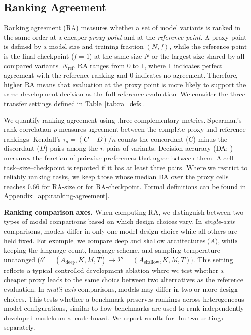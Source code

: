 




\subsection{Ranking Agreement}
\label{subsec:methodology-da}

Ranking agreement (RA) measures whether a set of model variants is ranked in the same order at a cheaper \emph{proxy point} and at the  \emph{reference point}. 
A proxy point is defined by a model size and training fraction $(N,f)$, while the reference point is the final checkpoint ($f=1$) at the same size $N$ or the largest size shared by all compared variants, $N_{\mathrm{ref}}$.
RA ranges from 0 to 1, where 1 indicates perfect agreement with the reference ranking and 0 indicates no agreement.
Therefore, higher RA means that evaluation at the proxy point is more likely to support the same development decision as the full reference evaluation.
We consider the three transfer settings defined in Table~\ref{tab:ra_defs}.

We quantify ranking agreement using three complementary metrics. Spearman's rank correlation $\rho$ measures agreement between the complete proxy and reference rankings.
Kendall's $\tau_a = (C-D)/n$ counts the concordant ($C$) minus the discordant ($D$) pairs among the $n$ pairs of variants.
Decision accuracy (DA; \citealp{heineman_signal_2025}) measures the fraction of pairwise preferences that agree between them.
A cell task--size--checkpoint is reported if it has at least three pairs.
Where we restrict to reliably ranking tasks, we keep those whose median DA over the proxy cells reaches 0.66 for RA-size or for RA-checkpoint. Formal definitions can be found in Appendix~\ref{app:ranking-agreement}.

\textbf{Ranking comparison axes.}
When computing RA, we distinguish between two types of model comparisons based on which design choices vary.
In \emph{single-axis} comparisons, models differ in only one model design choice while all others are held fixed. 
For example, we compare deep and shallow architectures ($A$), while keeping the language count, language scheme, and sampling temperature unchanged
($\theta' = (A_\mathrm{deep},K,M,T) \rightarrow \theta'' = (A_\mathrm{shallow},K,M,T)$).
This setting reflects a typical controlled development ablation where we test whether a cheaper proxy leads to the same choice between two alternatives as the reference evaluation.
In \emph{multi-axis} comparisons, models may differ in two or more design choices. This tests whether a benchmark preserves rankings across heterogeneous model configurations, similar to how benchmarks are used to rank independently developed models on a leaderboard.
We report results for the two settings separately.


